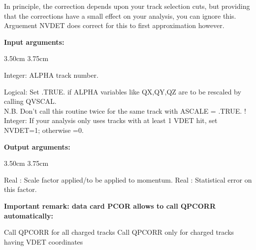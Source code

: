      In principle, the correction depends upon your track selection
     cuts, but providing that the corrections have a small effect on your
     analysis, you can ignore this. Arguement NVDET does correct for this
     to first approximation however.
     
\par
{}

{\bf Input arguments:}

\begin{indentlist} { 3.50cm}{ 3.75cm}

     Integer: ALPHA track number.

   Logical: Set .TRUE. if ALPHA variables like QX,QY,QZ
                          are to be rescaled by calling QVSCAL.\\
                          N.B. Don't call this routine twice for the
                          same track with ASCALE = .TRUE. !
   Integer: If your analysis only uses tracks with at
                          least 1 VDET hit, set NVDET=1; otherwise =0.
\end{indentlist}
{\bf Output arguments:}
\begin{indentlist} { 3.50cm}{ 3.75cm}

   Real    : Scale factor applied/to be applied to momentum.
   Real    : Statistical error on this factor.
    
\end{indentlist}

{\bf Important remark: data card PCOR allows to call QPCORR automatically:}

\begin{indentlist}{ 2.50cm}{ 2.75cm}
Call QPCORR  for all charged tracks 
Call QPCORR  only for charged tracks having VDET coordinates 
\end{indentlist}




